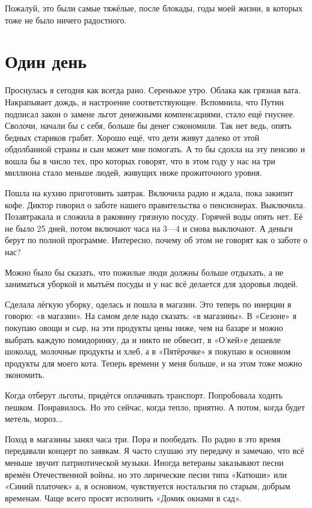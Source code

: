 Пожалуй, это были самые тяжёлые, после блокады, годы моей жизни, в которых тоже не было ничего радостного.

\section*{Один день}

{\sloppy

Проснулась я сегодня как всегда рано.
Серенькое утро.
Облака как грязная вата.
Накрапывает дождь, и настроение соответствующее.
Вспомнила, что Путин подписал закон о замене льгот денежными компенсациями, стало ещё гнуснее.
Сволочи, начали бы с себя, больше бы денег сэкономили.
Так нет ведь, опять бедных стариков грабят.
Хорошо ещё, что дети живут далеко от этой обдолбанной страны и сын может мне помогать.
А то бы сдохла на эту пенсию и вошла бы в число тех, про которых говорят, что в этом году у нас на три миллиона стало меньше людей, живущих ниже прожиточного уровня.

}

Пошла на кухню приготовить завтрак.
Включила радио и ждала, пока закипит кофе.
Диктор говорил о заботе нашего правительства о пенсионерах.
Выключила.
Позавтракала и сложила в раковину грязную посуду.
Горячей воды опять нет.
Её не было 25 дней, потом включают часа на 3---4 и снова выключают.
А деньги берут по полной программе.
Интересно, почему об этом не говорят как о заботе о нас?

Можно было бы сказать, что пожилые люди должны больше отдыхать, а не заниматься уборкой и мытьём посуды и у нас всё делается для здоровья людей.

Сделала лёгкую уборку, оделась и пошла в магазин.
Это теперь по инерции я говорю: «в магазин».
На самом деле надо сказать: «в магазины».
В «Сезоне» я покупаю овощи и сыр, на эти продукты цены ниже, чем на базаре и можно выбрать каждую помидоринку, да и никто не обвесит, в «О'кей»е дешевле шоколад, молочные продукты и хлеб, а в «Пятёрочке» я покупаю в основном продукты для моего кота.
Теперь времени у меня больше, и на этом тоже можно экономить.

Когда отберут льготы, придётся оплачивать транспорт.
Попробовала ходить пешком.
Понравилось.
Но это сейчас, когда тепло, приятно.
А потом, когда будет метель, мороз...

Поход в магазины занял часа три.
Пора и пообедать.
По радио в это время передавали концерт по заявкам.
Я часто слушаю эту передачу и замечаю, что всё меньше звучит патриотической музыки.
Иногда ветераны заказывают песни времён Отечественной войны, но это лирические песни типа «Катюши» или «Синий платочек» а, в основном, чувствуется ностальгия по старым, добрым временам.
Чаще всего просят исполнить «Домик окнами в сад».

